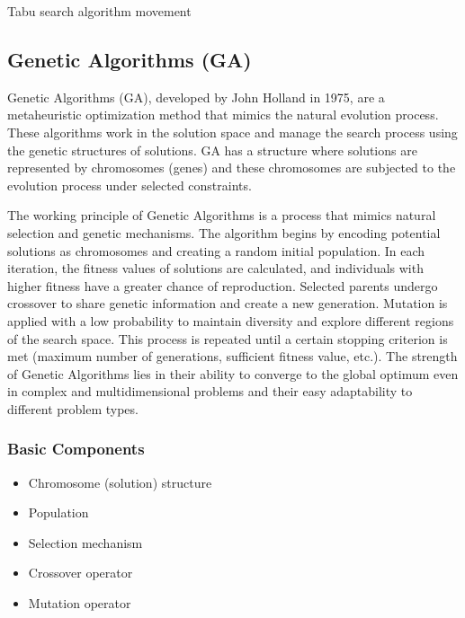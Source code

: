 \begin{marginfigure}
\centering
{}
\caption{Tabu search algorithm movement}
\label{fig:tabu_search}
\end{marginfigure}

\subsection{Genetic Algorithms (GA)}
Genetic Algorithms (GA), developed by John Holland in 1975, are a metaheuristic optimization method that mimics the natural evolution process. These algorithms work in the solution space and manage the search process using the genetic structures of solutions. GA has a structure where solutions are represented by chromosomes (genes) and these chromosomes are subjected to the evolution process under selected constraints.

The working principle of Genetic Algorithms is a process that mimics natural selection and genetic mechanisms. The algorithm begins by encoding potential solutions as chromosomes and creating a random initial population. In each iteration, the fitness values of solutions are calculated, and individuals with higher fitness have a greater chance of reproduction. Selected parents undergo crossover to share genetic information and create a new generation. Mutation is applied with a low probability to maintain diversity and explore different regions of the search space. This process is repeated until a certain stopping criterion is met (maximum number of generations, sufficient fitness value, etc.). The strength of Genetic Algorithms lies in their ability to converge to the global optimum even in complex and multidimensional problems and their easy adaptability to different problem types.

\subsubsection{Basic Components}
\begin{itemize}
    \item Chromosome (solution) structure
    \item Population
    \item Selection mechanism
    \item Crossover operator
    \item Mutation operator
\end{itemize}


